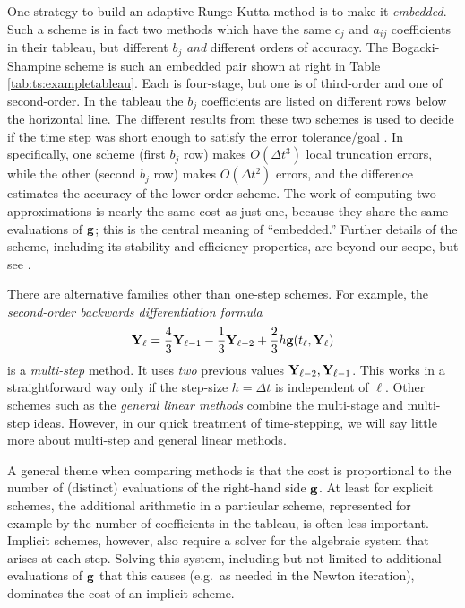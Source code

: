 One strategy to build an adaptive Runge-Kutta method is to make it \emph{embedded}.  Such a scheme is in fact two methods which have the same $c_j$ and $a_{ij}$ coefficients in their tableau, but different $b_j$ \emph{and} different orders of accuracy.  The Bogacki-Shampine scheme \RKthreebs is such an embedded pair shown at right in Table \ref{tab:ts:exampletableau}.  Each is four-stage, but one is of third-order and one of second-order.  In the tableau the $b_j$ coefficients are listed on different rows below the horizontal line.  The different results from these two schemes is used to decide if the time step was short enough to satisfy the error tolerance/goal \citep{Butcher2008}.  In \RKthreebs specifically, one scheme (first $b_j$ row) makes $O(\Delta t^3)$ local truncation errors, while the other (second $b_j$ row) makes $O(\Delta t^2)$ errors, and the difference estimates the accuracy of the lower order scheme.  The work of computing two approximations is nearly the same cost as just one, because they share the same evaluations of $\mathbf{g}$; this is the central meaning of ``embedded.''  Further details of the \RKthreebs scheme, including its stability and efficiency properties, are beyond our scope, but see \citep{BogackiShampine1989}.

There are alternative families other than one-step schemes.  For example, the \emph{second-order backwards differentiation formula}
\begin{equation}
\mathbf{Y}_\ell = \frac{4}{3} \mathbf{Y}_{\ell-1} - \frac{1}{3} \mathbf{Y}_{\ell-2} + \frac{2}{3} h \mathbf{g}(t_\ell,\mathbf{Y}_{\ell}) \label{eq:ts:bdf2}
\end{equation}
is a \emph{multi-step} method.  It uses \emph{two} previous values $\mathbf{Y}_{\ell-2},\mathbf{Y}_{\ell-1}$.  This works in a straightforward way only if the step-size $h=\Delta t$ is independent of $\ell$.  Other schemes such as the \emph{general linear methods} \citep{Butcher2008} combine the multi-stage and multi-step ideas.  However, in our quick treatment of time-stepping, we will say little more about multi-step and general linear methods.

A general theme when comparing methods is that the cost is proportional to the number of (distinct) evaluations of the right-hand side $\mathbf{g}$.  At least for explicit schemes, the additional arithmetic in a particular scheme, represented for example by the number of coefficients in the tableau, is often less important.  Implicit schemes, however, also require a solver for the algebraic system that arises at each step.  Solving this system, including but not limited to additional evaluations of $\mathbf{g}$ that this causes (e.g.~as needed in the Newton iteration), dominates the cost of an implicit scheme.

